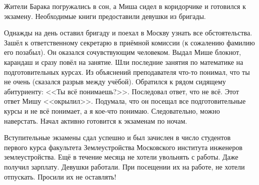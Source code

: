 Жители Барака погружались в сон, а Миша сидел в коридорчике и готовился к экзамену. Необходимые книги предоставили девушки из бригады.

Однажды на день оставил бригаду и поехал в Москву узнать все обстоятельства. Зашёл к ответственному секретарю в приёмной комиссии (к сожалению фамилию его позабыл). Он оказался сочувствующим человеком. Выдал Мише блокнот, карандаш и сразу повёл на занятие. Шли последние занятия по математике на подготовительных курсах. Из объяснений преподавателя что-то понимал, что ты не очень (сказался разрыв между учёбой). Обратился к рядом сидящему абитуриенту: <<Ты всё понимаешь?>>. Последовал ответ, что не всё. Этот ответ Мишу <<окрылил>>. Подумала, что он посещал все подготовительные курсы и не всё понимает, а я кое-что понимаю. Следовательно, можно наверстать. Начал активно готовится к экзаменам по ночам.

Вступительные экзамены сдал успешно и был зачислен в число студентов первого курса факультета Землеустройства Московского института инженеров землеустройства. Ещё в течение месяца не хотели увольнять с работы. Даже получил зарплату. Девушки работали. При посещении их на работе, не хотели отпускать. Просили их не оставлять!